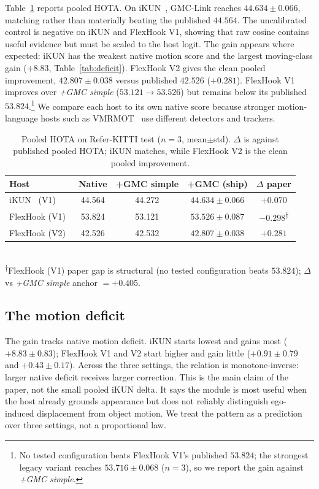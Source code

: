 \documentclass[sigconf,review,anonymous]{acmart}
\begin{document}
Table~\ref{tab:main} reports pooled HOTA. On iKUN~\cite{ikun}, GMC-Link reaches $44.634 \pm 0.066$, matching rather than materially beating the published $44.564$. The uncalibrated control is negative on iKUN and FlexHook V1, showing that raw cosine contains useful evidence but must be scaled to the host logit. The gain appears where expected: iKUN has the weakest native motion score and the largest moving-class gain ($+8.83$, Table~\ref{tab:deficit}). FlexHook V2 gives the clean pooled improvement, $42.807 \pm 0.038$ versus published $42.526$ ($+0.281$). FlexHook V1 improves over \emph{+GMC simple} ($53.121 \to 53.526$) but remains below its published $53.824$.\footnote{No tested configuration beats FlexHook V1's published $53.824$; the strongest legacy variant reaches $53.716 \pm 0.068$ ($n{=}3$), so we report the gain against \emph{+GMC simple}.} We compare each host to its own native score because stronger motion-language hosts such as VMRMOT~\cite{vmrmot} use different detectors and trackers.

\begin{table}[t]
\centering
\caption{Pooled HOTA on Refer-KITTI test ($n{=}3$, mean$\pm$std). $\Delta$ is against published pooled HOTA; iKUN matches, while FlexHook V2 is the clean pooled improvement.}
\label{tab:main}
\small
\setlength{\tabcolsep}{4pt}
\begin{tabular}{lcccc}
\toprule
Host & Native & +GMC simple & +GMC (ship) & $\Delta$ paper \\
\midrule
iKUN~\cite{ikun} (V1)        & 44.564 & 44.272 & $44.634 \pm 0.066$ & $+0.070$ \\
FlexHook (V1)~\cite{flexhook}  & 53.824 & 53.121 & $53.526 \pm 0.087$ & $-0.298$\textsuperscript{$\dagger$} \\
FlexHook (V2)~\cite{flexhook}  & 42.526 & 42.532 & $42.807 \pm 0.038$ & $+0.281$ \\
\bottomrule
\end{tabular}
\\[2pt]
{\footnotesize \textsuperscript{$\dagger$}FlexHook (V1) paper gap is structural (no tested configuration beats $53.824$); $\Delta$ vs \emph{+GMC simple} anchor $= +0.405$.}
\end{table}

\subsection{The motion deficit}
\label{sec:deficit}

The gain tracks native motion deficit. iKUN starts lowest and gains most ($+8.83 \pm 0.83$); FlexHook V1 and V2 start higher and gain little ($+0.91 \pm 0.79$ and $+0.43 \pm 0.17$). Across the three settings, the relation is monotone-inverse: larger native deficit receives larger correction. This is the main claim of the paper, not the small pooled iKUN delta. It says the module is most useful when the host already grounds appearance but does not reliably distinguish ego-induced displacement from object motion. We treat the pattern as a prediction over three settings, not a proportional law.
\end{document}
